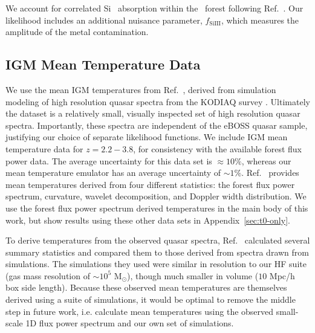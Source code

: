 We account for correlated Si~{} absorption within the \lya~forest following Ref.~\cite{2006ApJS..163...80M}.
Our likelihood includes an additional nuisance parameter, $f_\mathrm{SiIII}$, which measures the amplitude of the metal contamination. 


\subsection{IGM Mean Temperature Data}\label{sec:t0data}

We use the mean IGM temperatures from Ref.~\cite{2021MNRAS.506.4389G}, derived from simulation modeling of high resolution quasar spectra from the KODIAQ survey \cite{2017AJ....154..114O}.
Ultimately the dataset is a relatively small, visually inspected set of high resolution quasar spectra.
Importantly, these spectra are independent of the eBOSS quasar sample, justifying our choice of separate likelihood functions.
We include IGM mean temperature data for $z=2.2-3.8$, for consistency with the available \lya forest flux power data.
The average uncertainty for this data set is $\approx10\%$, whereas our mean temperature emulator has an average uncertainty of $\sim 1\%$.
Ref.~\cite{2021MNRAS.506.4389G} provides mean temperatures derived from four different statistics: the \lya forest flux power spectrum, curvature, wavelet decomposition, and Doppler width distribution.
We use the \lya forest flux power spectrum derived temperatures in the main body of this work, but show results using these other data sets in Appendix~\ref{sec:t0-only}.

To derive temperatures from the observed quasar spectra, Ref.~\cite{2021MNRAS.506.4389G} calculated several summary statistics and compared them to those derived from spectra drawn from simulations.
The simulations they used were similar in resolution to our HF suite (gas mass resolution of $\sim10^5$ M$_{\odot}$), though much smaller in volume ($10$ Mpc/h box side length).
Because these observed mean temperatures are themselves derived using a suite of simulations, it would be optimal to remove the middle step in future work, i.e. calculate mean temperatures using the observed small-scale 1D flux power spectrum and our own set of simulations.

